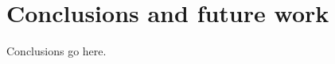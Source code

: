 \chapter{Conclusions and future work} %
\label{cha:conclusions_and_future_work}
Conclusions go here.

